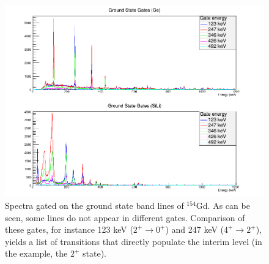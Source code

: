 \begin{figure}[!]
    \centering
    \includegraphics[scale=0.4]{154GdTablesAndFigs/154GS_stack.png}
    \caption{Spectra gated on the ground state band lines of $^{154}$Gd. As can be seen, some lines do not appear in different gates. Comparison of these gates, for instance 123 keV ($2^+\rightarrow0^+$) and 247 keV ($4^+\rightarrow2^+$), yields a list of transitions that directly populate the interim level (in the example, the $2^+$ state).}
    \label{fig:154_GS_Gate}
\end{figure}